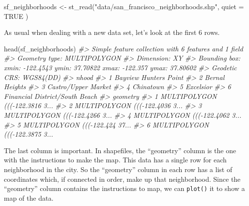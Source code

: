 \documentclass[
]{krantz}
\makeatletter
\newenvironment{Shaded}{\begin{snugshade}}{\end{snugshade}}
\newcommand{\AttributeTok}[1]{\textcolor[rgb]{0.61,0.61,0.61}{#1}}
\newcommand{\CommentTok}[1]{\textcolor[rgb]{0.37,0.37,0.37}{\textit{#1}}}
\newcommand{\ConstantTok}[1]{\textcolor[rgb]{0,0,0}{#1}}
\newcommand{\FunctionTok}[1]{\textcolor[rgb]{0,0,0}{#1}}
\newcommand{\NormalTok}[1]{#1}
\newcommand{\OtherTok}[1]{\textcolor[rgb]{0.37,0.37,0.37}{#1}}
\newcommand{\StringTok}[1]{\textcolor[rgb]{0.5,0.5,0.5}{#1}}
\newenvironment{kframe}{%
\medskip{}
\setlength{\fboxsep}{.8em}
 \def\at@end@of@kframe{}%
 \ifinner\ifhmode%
  \def\at@end@of@kframe{\end{minipage}}%
  \begin{minipage}{\columnwidth}%
 \fi\fi%
 \def\FrameCommand##1{\hskip\@totalleftmargin \hskip-\fboxsep
 \colorbox{shadecolor}{##1}\hskip-\fboxsep
     \hskip-\linewidth \hskip-\@totalleftmargin \hskip\columnwidth}%
 \MakeFramed {\advance\hsize-\width
   \@totalleftmargin\z@ \linewidth\hsize
   \@setminipage}}%
 {\par\unskip\endMakeFramed%
 \at@end@of@kframe}
\renewenvironment{Shaded}{\begin{kframe}}{\end{kframe}}
\makeatother
\begin{document}
\begin{Shaded}
\begin{Highlighting}[]
\NormalTok{sf\_neighborhoods }\OtherTok{\textless{}{-}} \FunctionTok{st\_read}\NormalTok{(}\StringTok{"data/san\_francisco\_neighborhoods.shp"}\NormalTok{,}
  \AttributeTok{quiet =} \ConstantTok{TRUE}
\NormalTok{)}
\end{Highlighting}
\end{Shaded}

As usual when dealing with a new data set, let's look at the
first 6 rows.

\begin{Shaded}
\begin{Highlighting}[]
\FunctionTok{head}\NormalTok{(sf\_neighborhoods)}
\CommentTok{\#\textgreater{} Simple feature collection with 6 features and 1 field}
\CommentTok{\#\textgreater{} Geometry type: MULTIPOLYGON}
\CommentTok{\#\textgreater{} Dimension:     XY}
\CommentTok{\#\textgreater{} Bounding box:  xmin: {-}122.4543 ymin: 37.70822 xmax: {-}122.357 ymax: 37.80602}
\CommentTok{\#\textgreater{} Geodetic CRS:  WGS84(DD)}
\CommentTok{\#\textgreater{}                            nhood}
\CommentTok{\#\textgreater{} 1          Bayview Hunters Point}
\CommentTok{\#\textgreater{} 2                 Bernal Heights}
\CommentTok{\#\textgreater{} 3            Castro/Upper Market}
\CommentTok{\#\textgreater{} 4                      Chinatown}
\CommentTok{\#\textgreater{} 5                      Excelsior}
\CommentTok{\#\textgreater{} 6 Financial District/South Beach}
\CommentTok{\#\textgreater{}                         geometry}
\CommentTok{\#\textgreater{} 1 MULTIPOLYGON ((({-}122.3816 3...}
\CommentTok{\#\textgreater{} 2 MULTIPOLYGON ((({-}122.4036 3...}
\CommentTok{\#\textgreater{} 3 MULTIPOLYGON ((({-}122.4266 3...}
\CommentTok{\#\textgreater{} 4 MULTIPOLYGON ((({-}122.4062 3...}
\CommentTok{\#\textgreater{} 5 MULTIPOLYGON ((({-}122.424 37...}
\CommentTok{\#\textgreater{} 6 MULTIPOLYGON ((({-}122.3875 3...}
\end{Highlighting}
\end{Shaded}

The last column is important. In shapefiles, the
``geometry'' column is the one with the instructions to make
the map. This data has a single row for each neighborhood in
the city. So the ``geometry'' column in each row has a list
of coordinates which, if connected in order, make up that
neighborhood. Since the ``geometry'' column contains the
instructions to map, we can \texttt{plot()} it to show a map
of the data.
\end{document}
